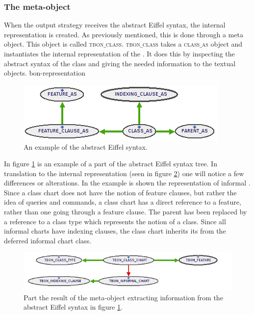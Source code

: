 \subsubsection{The meta-object}
\label{tbon_class}
When the output strategy receives the abstract Eiffel syntax, the internal \bon{} representation is created. As previously mentioned, this is done through a meta object. This object is called \textsc{tbon$\_$class}. \textsc{tbon$\_$class} takes a \textsc{class$\_$as} object and instantiates the internal representation of the \bon{}. It does this by inspecting the abstract syntax of the class and giving the needed information to the textual \bon{} objects.
bon-representation
\begin{figure}[H]
\centerline{
\includegraphics[scale=0.7]{images/abstract-syntax.png}
}
\caption{An example of the abstract Eiffel syntax.}
\label{fig:abstract-syntax}
\end{figure}

In figure \ref{fig:abstract-syntax} is an example of a part of the abstract Eiffel syntax tree. In translation to the \bon{} internal representation (seen in figure \ref{fig:bon-rep}) one will notice a few differences or alterations. In the example is shown the representation of informal \bon. Since a class chart does not have the notion of feature clauses, but rather the idea of queries and commands, a class chart has a direct reference to a feature, rather than one going through a feature clause. The parent has been replaced by a reference to a class type which represents the notion of a class. Since all informal charts have indexing clauses, the class chart inherits its from the deferred informal chart class.
\begin{figure}[H]
\centerline{
\includegraphics[scale=0.7]{images/bon-representation.png}
}
\caption{Part the result of the meta-object extracting information from the abstract Eiffel syntax in figure \ref{fig:abstract-syntax}.}
\label{fig:bon-rep}
\end{figure}
